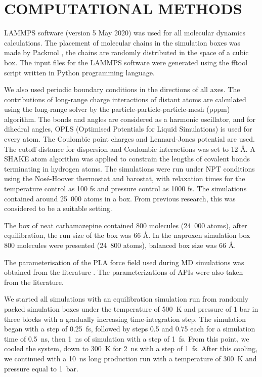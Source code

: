 \newpage
\section{COMPUTATIONAL METHODS}


LAMMPS software \cite{thompson_lammps_2022} (version 5 May 2020) was used for all molecular dynamics calculations. The placement of molecular chains in the simulation boxes was made by Packmol \cite{martinez_p_2009}, the chains are randomly distributed in the space of a cubic box. The input files for the LAMMPS software were generated using the fftool \cite{fftool} script written in Python programming language.

We also used periodic boundary conditions in the directions of all axes. The contributions of long-range charge interactions of distant atoms are calculated using the long-range solver by the particle-particle-particle-mesh (pppm) algorithm\cite{hockney1988}. The bonds and angles are considered as a harmonic oscillator, and for dihedral angles, OPLS (Optimised Potentials for Liquid Simulations) is used for every atom. The Coulombic point charges and Lennard-Jones potential are used. The cutoff distance for dispersion and Coulombic interactions was set to 12 \r{A}. A SHAKE atom algorithm\cite{ryckaert1977} was applied to constrain the lengths of covalent bonds terminating in hydrogen atoms. The simulations were run under NPT conditions using the Nosé-Hoover thermostat and barostat\cite{tuckerman2006}, with relaxation times for the temperature control as 100 fs and pressure control as 1000 fs. The simulations contained around 25~000 atoms in a box. From previous research, this was considered to be a suitable setting.

The box of neat carbamazepine contained 800 molecules (24~000 atoms), after equilibration, the run size of the box was 66 \r{A}. In the naproxen simulation box 800 molecules were presented (24~800 atoms), balanced box size was 66 \r{A}.

The parameterisation of the PLA force field used during MD simulations was obtained from the literature \cite{ff_pla}. The parameterizations of APIs were also taken from the literature\cite{pharmaceutics13081253}.

We started all simulations with an equilibration simulation run from randomly packed simulation boxes under the temperature of 500~K and pressure of 1 bar in three blocks with a gradually increasing time-integration step. The simulation began with a step of 0.25~fs, followed by steps 0.5 and 0.75 each for a simulation time of 0.5~ns, then 1~ns of simulation with a step of 1~fs. From this point, we cooled the system, down to 300~K for 2~ns with a step of 1~fs. After this cooling, we continued with a 10~ns long production run with a temperature of 300~K and pressure equal to 1~bar.

